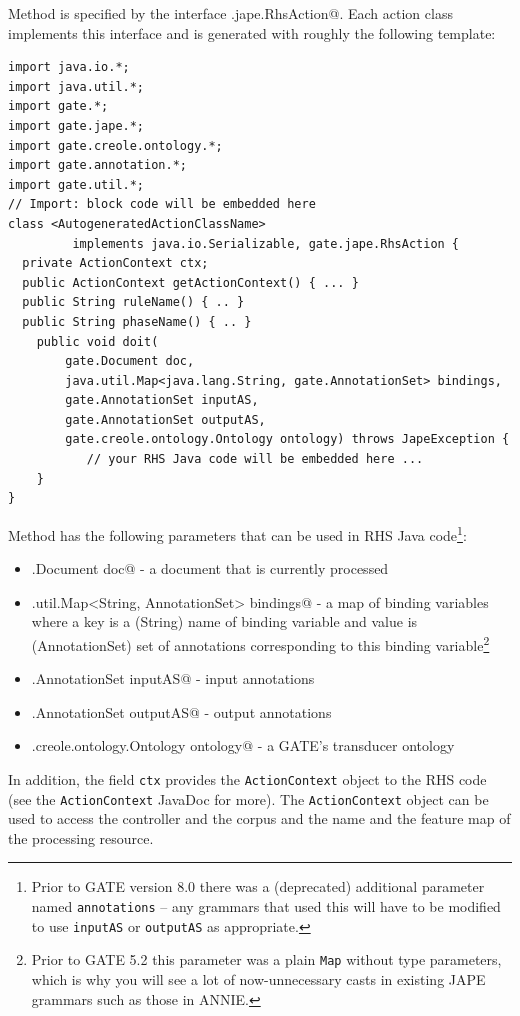 Method \verb@doit@ is specified by the interface \verb@gate.jape.RhsAction@.
Each action class implements this interface and is generated with roughly the following template:
\begin{lstlisting}
import java.io.*;
import java.util.*;
import gate.*;
import gate.jape.*;
import gate.creole.ontology.*;
import gate.annotation.*;
import gate.util.*;
// Import: block code will be embedded here
class <AutogeneratedActionClassName>
         implements java.io.Serializable, gate.jape.RhsAction {
  private ActionContext ctx;
  public ActionContext getActionContext() { ... }
  public String ruleName() { .. }
  public String phaseName() { .. } 
    public void doit(
        gate.Document doc,
        java.util.Map<java.lang.String, gate.AnnotationSet> bindings,
        gate.AnnotationSet inputAS,
        gate.AnnotationSet outputAS,
        gate.creole.ontology.Ontology ontology) throws JapeException {
           // your RHS Java code will be embedded here ...
    }
}
\end{lstlisting}

Method \verb@doit@ has the following parameters that can be used in RHS Java
code\footnote{Prior to GATE version 8.0 there was a (deprecated) additional
parameter named \texttt{annotations} -- any grammars that used this will have
to be modified to use \texttt{inputAS} or \texttt{outputAS} as appropriate.}:
\begin{itemize}
  \item \verb@gate.Document doc@ - a document that is currently processed
  \item \verb@java.util.Map<String, AnnotationSet> bindings@ - a map of binding
    variables where a key is a (String) name of binding variable and value is
    (AnnotationSet) set of annotations corresponding to this binding
    variable\footnote{Prior to GATE 5.2 this parameter was a plain \texttt{Map}
      without type parameters, which is why you will see a lot of
      now-unnecessary casts in existing JAPE grammars such as those in ANNIE.}
  \item \verb@gate.AnnotationSet inputAS@ - input annotations
  \item \verb@gate.AnnotationSet outputAS@ - output annotations
  \item \verb@gate.creole.ontology.Ontology ontology@ - a GATE's transducer ontology
\end{itemize}

In addition, the field \texttt{ctx} provides the \texttt{ActionContext} object
to the RHS code (see the \texttt{ActionContext} JavaDoc for more).
The \texttt{ActionContext} object can be used to access the controller and 
the corpus and the name and the feature map of the processing
resource. 

